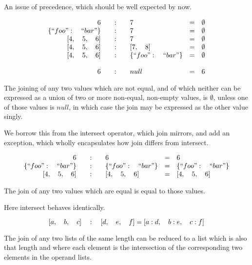 \documentclass[letterpaper]{article}
\begin{document}
An issue of precedence, which should be well expected by now.

\begin{prule}
\begin{equation}
\begin{array}{rclcl}
6 \quad&:&\quad 7 & = & \emptyset \\
\{``foo":\quad``bar"\} \quad&:&\quad 7 & = & \emptyset \\
{[}4,\quad5,\quad6] \quad&:&\quad 7 & = & \emptyset \\
{[}4,\quad5,\quad6] \quad&:&\quad {[}7,\quad8] & = & \emptyset \\
{[}4,\quad5,\quad6] \quad&:&\quad \{``foo":\quad``bar"\} & = & \emptyset \\
\\
6 \quad&:&\quad null & = & 6 \\
\end{array}
\end{equation}

The joining of any two values which are not equal, and of which neither
can be expressed as a union of two or more non-equal, non-empty values, is
\(\emptyset\), unless one of those values is \(null\), in which case the join
may be expressed as the other value singly.
\end{prule}

We borrow this from the intersect operator, which join mirrors, and add an
exception, which wholly encapsulates how join differs from intersect.

\begin{prule}
\begin{equation}
\begin{array}{rclcl}
6 \quad&:&\quad 6 & = & 6 \\
\{``foo":\quad``bar"\} \quad&:&\quad \{``foo":\quad``bar"\}  & = & \{``foo":\quad``bar"\} \\
{[}4,\quad5,\quad6] \quad&:&\quad {[}4,\quad5,\quad6] & = & {[}4,\quad5,\quad6] \\
\end{array}
\end{equation}

The join of any two values which are equal is equal to those values.
\end{prule}

Here intersect behaves identically.

\begin{prule}
\begin{equation}
{[}a,\quad b,\quad c] \quad:\quad {[}d,\quad e,\quad f]  =  {[}a: d,\quad
b: e,\quad c: f] \\
\end{equation}

The join of any two lists of the same length can be reduced to a list
which is also that length and where each element is the intersection of the
corresponding two elements in the operand lists.
\end{prule}
\end{document}
